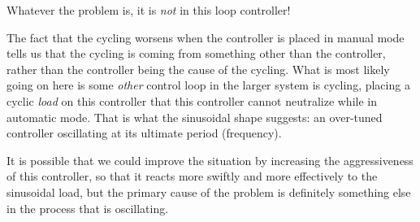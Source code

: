 





Whatever the problem is, it is {\it not} in this loop controller! 







The fact that the cycling worsens when the controller is placed in manual mode tells us that the cycling is coming from something other than the controller, rather than the controller being the cause of the cycling.  What is most likely going on here is some {\it other} control loop in the larger system is cycling, placing a cyclic {\it load} on this controller that this controller cannot neutralize while in automatic mode.  That is what the sinusoidal shape suggests: an over-tuned controller oscillating at its ultimate period (frequency).

It is possible that we could improve the situation by increasing the aggressiveness of this controller, so that it reacts more swiftly and more effectively to the sinusoidal load, but the primary cause of the problem is definitely something else in the process that is oscillating.




